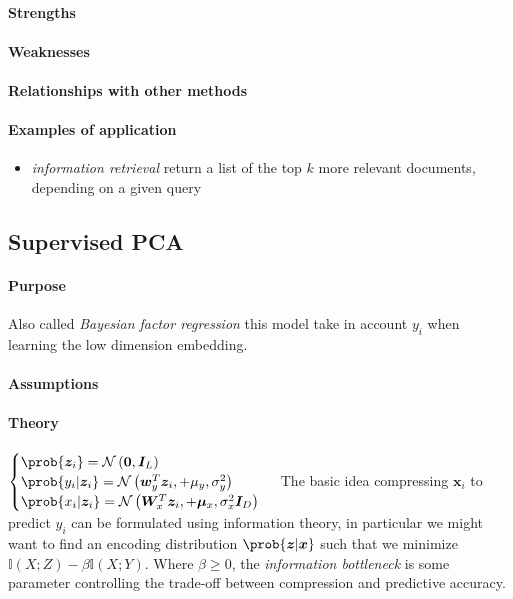 \paragraph{Strengths}
\paragraph{Weaknesses}
\paragraph{Relationships with other methods}
\paragraph{Examples of application}
\begin{itemize}
    \item \emph{information retrieval} return a list of the top $k$ more relevant 
        documents, depending on a given query 
\end{itemize}

\subsection{Supervised PCA}
\paragraph{Purpose}
Also called \emph{Bayesian factor regression} this model take in account $y_{i}$ when
learning the low dimension embedding.
\paragraph{Assumptions}
\paragraph{Theory}
$\begin{cases}
    \prob{\bm{z}_{i}} = \mathcal{N}\left(\bm{0}, \bm{I}_{L}\right) \\
    \prob{y_{i}|\bm{z}_{i}} = \mathcal{N}\left(\bm{w}_{y}^{T}\bm{z}_{i},
    +\mu_{y},\sigma_{y}^{2}\right) \\
    \prob{x_{i}|\bm{z}_{i}} = \mathcal{N}\left(\bm{W}_{x}^{T}\bm{z}_{i},
    +\bm{\mu}_{x},\sigma_{x}^{2}\bm{I}_{D}\right)
\end{cases}$
The basic idea compressing $\bm{x}_{i}$ to predict $y_{i}$ can be formulated using
information theory, in particular we might want to find an encoding distribution
$\prob{\bm{z}|\bm{x}}$ such that we minimize $\mathbb{I}(X;Z) - \beta\mathbb{I}(X;Y)$.
Where $\beta\geq 0$, the \emph{information bottleneck} is some parameter controlling 
the trade-off between compression and predictive accuracy.
